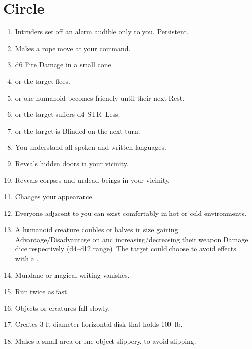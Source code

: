 \documentclass[itdr]{subfiles}
\begin{document}

\vfill
\break

\section{ Circle}
\def \spellcircle {1}
\begin{enumerate}
	\item {} Intruders set off an alarm audible only to you. Persistent.
	\item {} Makes a rope move at your command.
	\item {} d6 Fire Damage in a small cone.
	\item {}  or the target flees.
	\item {}  or one humanoid becomes friendly until their next Rest.
	\item {}  or the target suffers d4~STR~Loss.
	\item {}  or the target is Blinded on the next turn.
	\item {} You understand all spoken and written languages.
	\item {} Reveals hidden doors in your vicinity.
	\item {} Reveals corpses and undead beings in your vicinity.
	\item {} Changes your appearance.
	\item {} Everyone adjacent to you can exist comfortably in hot or cold environments.
	\item {} A humanoid creature doubles or halves in size gaining Advantage/Disadvantage on  and increasing/decreasing their weapon Damage dice respectively (d4--d12 range). The target could choose to avoid effects with a .
	\item {} Mundane or magical writing vanishes.
	\item {} Run twice as fast.
	\item {} Objects or creatures fall slowly.
	\item {} Creates 3-ft-diameter horizontal disk that holds 100~lb.
	\item {} Makes a small area or one object slippery.  to avoid slipping.

\end{enumerate}
\end{document}
